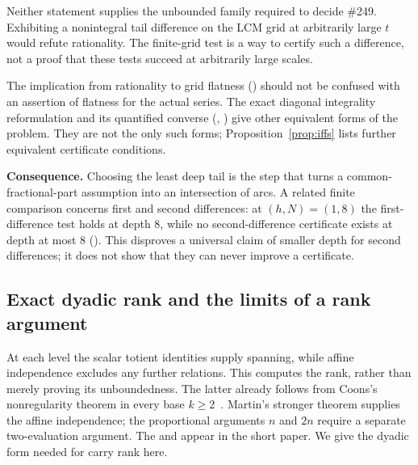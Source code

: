 Neither statement supplies the unbounded family required to decide
\#249. Exhibiting a nonintegral tail difference on the LCM grid at
arbitrarily large $t$ would refute rationality. The finite-grid test is a
way to certify such a difference, not a proof that these tests succeed
at arbitrarily large scales.

The implication from rationality to grid flatness
()
should not be confused with an assertion of flatness for the actual series.
The exact diagonal integrality reformulation and its quantified converse
(,
)
give other equivalent forms of the problem. They are not the only such
forms; Proposition~\ref{prop:iffs} lists further equivalent certificate
conditions.

\textbf{Consequence.} Choosing the least deep tail is the step that
turns a common-fractional-part assumption into an intersection of arcs.
A related finite comparison concerns first and second differences: at
$(h,N)=(1,8)$ the first-difference test holds at depth $8$, while no
second-difference certificate exists at depth at most $8$
().
This disproves a universal claim of smaller depth for second differences;
it does not show that they can never improve a certificate.

\subsection{Exact dyadic rank and the limits of a rank argument}
\label{sec:mahler-defect}

At each level the scalar totient identities supply spanning, while
affine independence excludes any further relations. This computes
the rank, rather than merely proving its unboundedness. The latter
already follows from Coons's nonregularity theorem in every base
$k\ge2$~\cite[Theorem~3.2]{coons}. Martin's stronger theorem supplies
the affine independence\cite[Theorem~1]{martin-phi-inequalities}; the
proportional arguments $n$ and $2n$ require a separate two-evaluation
argument. The  and
 appear
in the short paper. We give the dyadic form needed for carry rank here.

